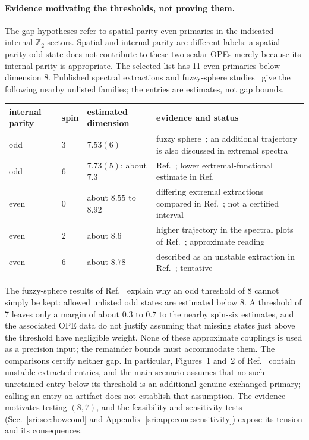 \paragraph{Evidence motivating the thresholds, not proving them.} The gap hypotheses refer to spatial-parity-even
primaries in the indicated internal $\mathbb Z_2$ sectors. Spatial and internal parity are different labels: a
spatial-parity-odd state does not contribute to these two-scalar OPEs merely because its internal parity is
appropriate. The selected list has 11 even primaries below dimension 8. Published spectral extractions and fuzzy-sphere
studies~\cite{sri:Simmons-Duffin:2016wlq,sri:Henriksson:2022,sri:Zhu:2022,sri:Fardelli:2026} give the following nearby unlisted
families; the entries are estimates, not gap bounds.
\begin{center}\small
\begin{tabular}{@{}llp{}p{}@{}}
\toprule
internal parity & spin & estimated dimension & evidence and status\\
\midrule
odd & 3 & $7.53(6)$ & fuzzy sphere~\cite{sri:Fardelli:2026}; an additional trajectory is also discussed in extremal spectra\\
odd & 6 & $7.73(5)$; about $7.3$ & Ref.~\cite{sri:Fardelli:2026}; lower extremal-functional estimate in Ref.~\cite{sri:Henriksson:2022}\\
even & 0 & about $8.55$ to $8.92$ & differing extremal extractions compared in Ref.~\cite{sri:Henriksson:2022}; not a certified interval\\
even & 2 & about $8.6$ & higher trajectory in the spectral plots of Ref.~\cite{sri:Henriksson:2022}; approximate reading\\
even & 6 & about $8.78$ & described as an unstable extraction in Ref.~\cite{sri:Henriksson:2022}; tentative\\
\bottomrule
\end{tabular}
\end{center}
The fuzzy-sphere results of Ref.~\cite{sri:Fardelli:2026} explain why an odd threshold of 8 cannot simply be kept: allowed
unlisted odd states are estimated below 8. A threshold of 7 leaves only a margin of about $0.3$ to $0.7$ to the nearby
spin-six estimates, and the associated OPE data do not justify assuming that missing states just above the threshold
have negligible weight. None of these approximate couplings is used as a precision input; the remainder bounds must
accommodate them. The comparisons certify neither gap. In particular, Figures~1 and~2 of
Ref.~\cite{sri:Simmons-Duffin:2016wlq} contain unstable extracted entries, and the main scenario assumes that no such
unretained entry below its threshold is an additional genuine exchanged primary; calling an entry an artifact does not
establish that assumption. The evidence motivates testing $(8,7)$, and the feasibility and sensitivity tests
(Sec.~\ref{sri:sec:howcond} and Appendix~\ref{sri:app:cone:sensitivity}) expose its tension and its consequences.

